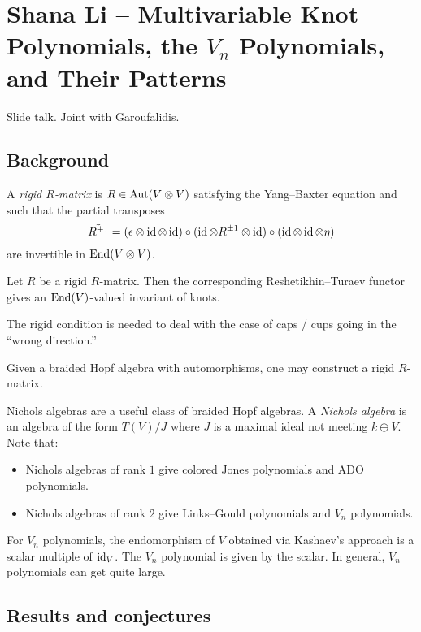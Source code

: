 \documentclass{amsart}
\begin{document}
\section{Shana Li -- Multivariable Knot Polynomials, the \texorpdfstring{$V_n$}{V\_n} Polynomials, and Their Patterns}

Slide talk.
Joint with Garoufalidis.

\subsection{Background}

A \emph{rigid $R$-matrix} is $R \in \operatorname{Aut}(V \otimes V)$ satisfying the Yang--Baxter equation and such that the partial transposes
\[
  \tilde{R^{\pm 1}} = (\epsilon \otimes \operatorname{id} \otimes \operatorname{id}) \circ (\operatorname{id} \otimes R^{\pm 1} \otimes \operatorname{id}) \circ (\operatorname{id} \otimes \operatorname{id} \otimes \eta)
\]
are invertible in $\operatorname{End}(V \otimes V)$.

\begin{thm}[Kashaev]
  Let $R$ be a rigid $R$-matrix.
  Then the corresponding Reshetikhin--Turaev functor gives an $\operatorname{End}(V)$-valued invariant of knots.
\end{thm}

The rigid condition is needed to deal with the case of caps / cups going in the ``wrong direction.''

\begin{thm}
  Given a braided Hopf algebra with automorphisms, one may construct a rigid $R$-matrix.
\end{thm}

Nichols algebras are a useful class of braided Hopf algebras.
A \emph{Nichols algebra} is an algebra of the form $T(V) / J$ where $J$ is a maximal ideal not meeting $k \oplus V$.
Note that:
\begin{itemize}
  \item Nichols algebras of rank $1$ give colored Jones polynomials and ADO polynomials.
  \item Nichols algebras of rank $2$ give Links--Gould polynomials and $V_n$ polynomials.
\end{itemize}

For $V_n$ polynomials, the endomorphism of $V$ obtained via Kashaev's approach is a scalar multiple of $\operatorname{id}_V$.
The $V_n$ polynomial is given by the scalar.
In general, $V_n$ polynomials can get quite large.

\subsection{Results and conjectures}
\end{document}
